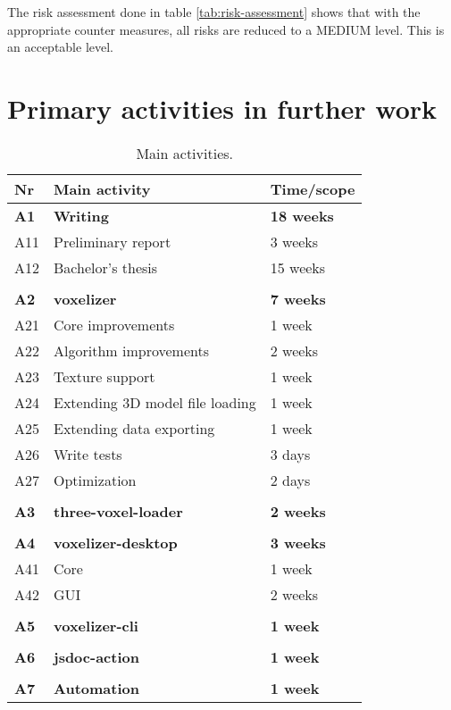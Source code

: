 The risk assessment done in table \ref{tab:risk-assessment} shows that with the appropriate counter measures, all risks are reduced to a MEDIUM level. This is an acceptable level.

\section{Primary activities in further work}
\label{sec:primary-activities}
\begin{table}[H]
\setlength{\tabcolsep}{2em}
\caption{Main activities.}
\begin{tabularx}{\textwidth}{@{\hspace*{2.5em}}l X l }
	\multicolumn{1}{l}{\textbf{Nr}} & \textbf{Main activity} & \textbf{Time/scope} \\
	\hline
	\multicolumn{1}{l}{\textbf{A1}} & \textbf{Writing} & \textbf{18 weeks} \\
	A11 & Preliminary report & 3 weeks \\
	A12 & Bachelor's thesis & 15 weeks \\
	\\
	\multicolumn{1}{l}{\textbf{A2}} & \textbf{voxelizer} & \textbf{7 weeks} \\
	A21 & Core improvements & 1 week\\
	A22 & Algorithm improvements & 2 weeks\\
	A23 & Texture support & 1 week \\
	A24 & Extending 3D model file loading & 1 week \\
	A25 & Extending data exporting & 1 week \\
	A26 & Write tests & 3 days \\
	A27 & Optimization & 2 days \\
	\\
	\multicolumn{1}{l}{\textbf{A3}} & \textbf{three-voxel-loader} & \textbf{2 weeks} \\
	\\
	\multicolumn{1}{l}{\textbf{A4}} & \textbf{voxelizer-desktop} & \textbf{3 weeks} \\
	A41 & Core & 1 week \\
	A42 & GUI & 2 weeks \\
	\\
	\multicolumn{1}{l}{\textbf{A5}} & \textbf{voxelizer-cli} & \textbf{1 week} \\
	\\
	\multicolumn{1}{l}{\textbf{A6}} & \textbf{jsdoc-action} & \textbf{1 week} \\
	\\
	\multicolumn{1}{l}{\textbf{A7}} & \textbf{Automation} & \textbf{1 week} \\
\end{tabularx}
\end{table}






